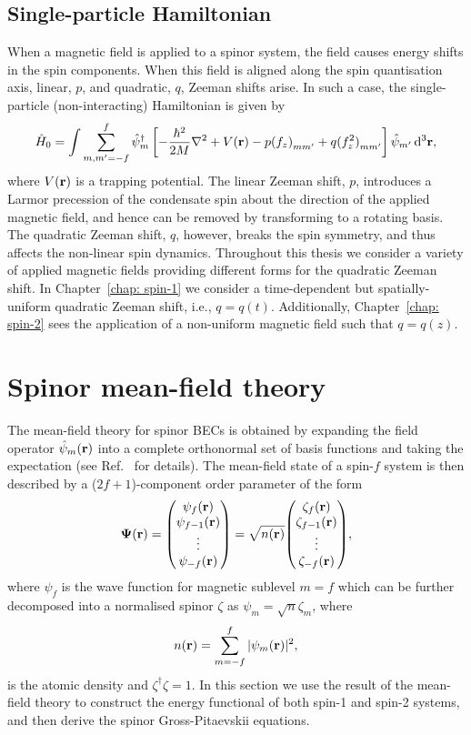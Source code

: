 \subsection{Single-particle Hamiltonian}\label{subsec: single-particle}
When a magnetic field is applied to a spinor system, the field causes energy
shifts in the spin components.
When this field is aligned along the spin quantisation axis, linear, \(p\), and
quadratic, \(q\), Zeeman shifts arise.
In such a case, the single-particle (non-interacting) Hamiltonian is given
by~\cite{Kawaguchi2012}
\begin{equation}\label{eq: single-particle-Hamiltonian}
    \hat{H}_0 = \int \sum_{m,m'=-f}^{f} \hat{\psi}_m^\dagger \left[
        -\frac{\hbar^2}{2M}\nabla^2 + V(\vb{r})
        - p{(f_z)}_{mm'} + q{(f_z^2)}_{mm'}\right]\hat{\psi}_{m'} \,\dd^3\vb{r},
\end{equation}
where \(V(\vb{r})\) is a trapping potential.
The linear Zeeman shift, \(p\), introduces a Larmor precession of the condensate
spin about the direction of the applied magnetic field, and hence can be
removed by transforming to a rotating basis.
The quadratic Zeeman shift, \(q\), however, breaks the spin symmetry, and thus
affects the non-linear spin dynamics.
Throughout this thesis we consider a variety of applied magnetic fields
providing different forms for the quadratic Zeeman shift.
In Chapter~\ref{chap: spin-1} we consider a time-dependent but spatially-uniform
quadratic Zeeman shift, i.e., \(q = q(t)\).
Additionally, Chapter~\ref{chap: spin-2} sees the application of a non-uniform
magnetic field such that \(q=q(z)\).

\section{Spinor mean-field theory}
The mean-field theory for spinor BECs is obtained by expanding the field
operator \(\hat{\psi}_m(\vb{r})\) into a complete orthonormal set of basis
functions and taking the expectation (see Ref.~\cite{Kawaguchi2012} for
details).
The mean-field state of a spin-\(f\) system is then described by a
(\(2f+1\))-component order parameter of the form
\begin{align}
    \vb{\Psi}(\vb{r}) = \mqty(\psi_f(\vb{r}) \\ \psi_{f-1}(\vb{r}) \\
    \vdots \\ \psi_{-f}(\vb{r})) = \sqrt{n(\vb{r})}\mqty(\zeta_f(\vb{r}) \\
    \zeta_{f-1}(\vb{r}) \\ \vdots \\ \zeta_{-f}(\vb{r})),
\end{align}
where \(\psi_f\) is the wave function for magnetic sublevel \(m=f\)
which can be further decomposed into a normalised spinor \(\zeta\) as
\(\psi_m=\sqrt{n}\zeta_m\), where
\begin{align}
    n(\vb{r}) = \sum_{m=-f}^f|\psi_m(\vb{r})|^2,
\end{align}
is the atomic density and \(\zeta^\dagger\zeta=1\).
In this section we use the result of the mean-field theory to construct the
energy functional of both spin-1 and spin-2 systems, and then derive the
spinor Gross-Pitaevskii equations.

